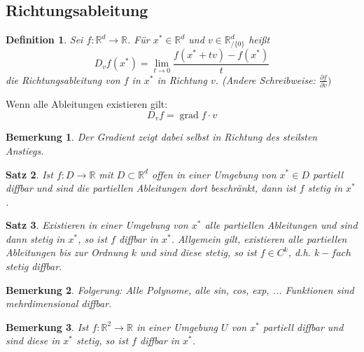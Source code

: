\documentclass[12pt,a4paper]{article}%
\DeclareMathOperator{\grad}{grad}
\newtheorem{satz}{Satz}[section]
\newtheorem{definition}[satz]{Definition}
\newtheorem{bem}{Bemerkung}[section]
\numberwithin{equation}{section}
\newcommand{\R}{\mathbb{R}} %
\def\dfp#1#2{\frac{\partial #1}{\partial #2}}
\numberwithin{equation}{subsection}
\begin{document}
  \subsection{Richtungsableitung}
  \begin{definition}
    Sei $f: \R^d \rightarrow \R$. Für $x^* \in \R^d$ und $v \in \R^d _{/ \lbrace 0 \rbrace}$ heißt
    \begin{equation}
      D_v f(x^*) = \lim\limits_{t\rightarrow 0} \frac{f(x^* +tv)-f(x^*)}{t}
    \end{equation}
    die Richtungsableitung von $f$ in $x^*$ in Richtung $v$. (Andere Schreibweise: $\dfp{f}{v})$
  \end{definition}
  Wenn alle Ableitungen existieren gilt:
  \begin{equation}
    D_v f = \grad f \cdot v
  \end{equation}
  \begin{bem}
    Der Gradient zeigt dabei selbst in Richtung des steilsten Anstiegs.
  \end{bem}
  
  \begin{satz}
    Ist $f: D\rightarrow \R$ mit $D \subset \R^d$ offen in einer Umgebung von $x^* \in D$ partiell diffbar und sind die partiellen Ableitungen dort beschränkt, dann ist $f$ stetig in $x^*$.
  \end{satz}
  
  \begin{satz}
    Existieren in einer Umgebung von $x^*$ alle partiellen Ableitungen und sind dann stetig in $x^*$, so ist $f$ diffbar in $x^*$. Allgemein gilt, existieren alle partiellen Ableitungen bis zur Ordnung $k$ und sind diese stetig, so ist $f \in C^k$, d.h. $k-fach$ stetig diffbar.
  \end{satz}
  
  \begin{bem}
    Folgerung: Alle Polynome, alle sin, cos, exp, ... Funktionen sind mehrdimensional diffbar.
  \end{bem}
  
  \begin{bem}
    Ist $f:\R^2 \rightarrow \R$ in einer Umgebung $U$ von $x^*$ partiell diffbar und sind diese in $x^*$ stetig, so ist $f$ diffbar in $x^*$.
  \end{bem}
  
\end{document}
